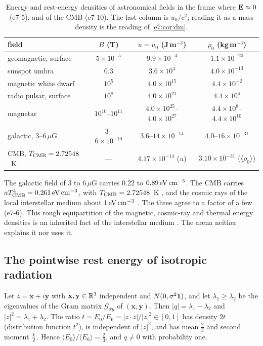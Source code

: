 \begin{table}[ht]
\centering
\small
\begin{tabular}{@{}lccc@{}}
\toprule
field & $B$ (T) & $u=u_0$ (J\,m$^{-3}$) & $\rho_0$ (kg\,m$^{-3}$)\\
\midrule
geomagnetic, surface & $5\times10^{-5}$ & $9.9\times10^{-4}$ & $1.1\times10^{-20}$\\
sunspot umbra & $0.3$ & $3.6\times10^{4}$ & $4.0\times10^{-13}$\\
magnetic white dwarf & $10^{5}$ & $4.0\times10^{15}$ & $4.4\times10^{-2}$\\
radio pulsar, surface & $10^{8}$ & $4.0\times10^{21}$ & $4.4\times10^{4}$\\
magnetar & $10^{10}$--$10^{11}$ & $4.0\times10^{25}$--$4.0\times10^{27}$ & $4.4\times10^{8}$--$4.4\times10^{10}$\\
galactic, $3$--$6\,\mu$G & $3$--$6\times10^{-10}$ & $3.6$--$14\times10^{-14}$ & $4.0$--$16\times10^{-31}$\\
\midrule
CMB, $T_{\rm CMB}=2.72548$~K & --- & $4.17\times10^{-14}$ ($u$) & $3.10\times10^{-31}$ ($\langle\rho_0\rangle$)\\
\bottomrule
\end{tabular}
\caption{Energy and rest-energy densities of astronomical fields in the frame where $\mathbf E\approx0$ (e7-5), and of the CMB (e7-10). The last
column is $u_0/c^2$; reading it as a mass density is the reading of \cref{e7:cor:dm}.}
\label{e7:tab:fields}
\end{table}

The galactic field of $3$ to $6\,\mu$G carries $0.22$ to $0.89\,{\rm eV\,cm^{-3}}$. The CMB carries $aT_{\rm CMB}^4=0.261\,{\rm eV\,cm^{-3}}$, with
$T_{\rm CMB}=2.72548$~K \cite{Fixsen09}, and the cosmic rays of the local interstellar medium about $1\,{\rm eV\,cm^{-3}}$ \cite{Ferriere01,Draine11}. The three agree to a
factor of a few (e7-6). This rough equipartition of the magnetic, cosmic-ray and thermal energy densities is an inherited fact of the interstellar
medium \cite{Ferriere01}. The arena neither explains it nor uses it.

\subsection{The pointwise rest energy of isotropic radiation}
\label{e7:sec:cmb}

\begin{proposition}
\label{e7:prop:gauss}
Let $z=\mathbf x+i\mathbf y$ with $\mathbf x,\mathbf y\in\mathbb{R}^3$ independent and $N(0,\sigma^2\mathbf 1)$, and let $\lambda_1\ge\lambda_2$ be the
eigenvalues of the Gram matrix $\mathcal G_{xy}$ of $(\mathbf x,\mathbf y)$. Then $|q|=\lambda_1-\lambda_2$ and $|z|^2=\lambda_1+\lambda_2$. The ratio
$t=E_0/E_6=|z\cdot z|/|z|^2\in[0,1]$ has density $2t$ (distribution function $t^2$), is independent of $|z|^2$, and has mean $\tfrac23$ and
second moment $\tfrac12$. Hence $\langle E_0\rangle/\langle E_6\rangle=\tfrac23$, and $q\neq0$ with probability one.
\end{proposition}

